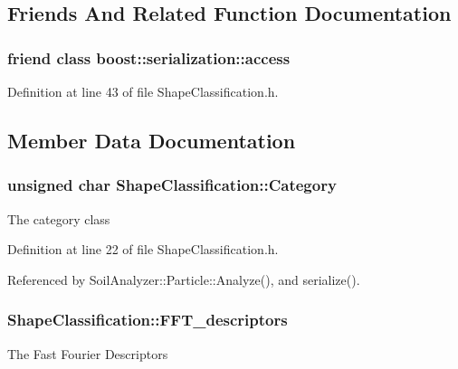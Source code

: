 \subsection{Friends And Related Function Documentation}
\hypertarget{class_shape_classification_ac98d07dd8f7b70e16ccb9a01abf56b9c}{}
\subsubsection[{boost\+::serialization\+::access}]{\setlength{\rightskip}{0pt plus 5cm}friend class boost\+::serialization\+::access\hspace{0.3cm}{\ttfamily [friend]}}\label{class_shape_classification_ac98d07dd8f7b70e16ccb9a01abf56b9c}


Definition at line 43 of file Shape\+Classification.\+h.



\subsection{Member Data Documentation}
\hypertarget{class_shape_classification_a5b723e358b86496ed6f4b25e2bf7af17}{}
\subsubsection[{Category}]{\setlength{\rightskip}{0pt plus 5cm}unsigned char Shape\+Classification\+::\+Category}\label{class_shape_classification_a5b723e358b86496ed6f4b25e2bf7af17}
The category class 

Definition at line 22 of file Shape\+Classification.\+h.



Referenced by Soil\+Analyzer\+::\+Particle\+::\+Analyze(), and serialize().

\hypertarget{class_shape_classification_afecc3c98ca8a930b359ddd936aad21f3}{}
\subsubsection[{F\+F\+T\+\_\+descriptors}]{ Shape\+Classification\+::\+F\+F\+T\+\_\+descriptors}\label{class_shape_classification_afecc3c98ca8a930b359ddd936aad21f3}
The Fast Fourier Descriptors 

